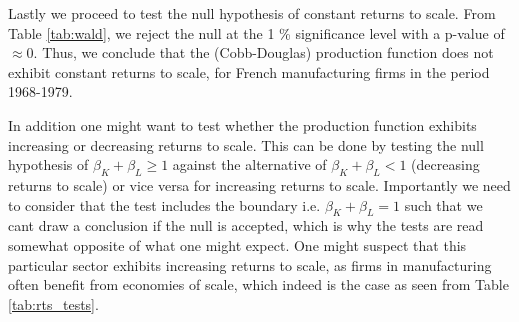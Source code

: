Lastly we proceed to test the null hypothesis of constant returns to scale. From Table \ref{tab:wald}, we reject the null at the 1 \% significance level with a p-value of $\approx 0$. Thus, we conclude that the (Cobb-Douglas) production function does not exhibit constant returns to scale, for French manufacturing firms in the period 1968-1979. 



In addition one might want to test whether the production function exhibits increasing or decreasing returns to scale. This can be done by testing the null hypothesis of $\beta_K + \beta_L \geq 1$ against the alternative of $\beta_K + \beta_L < 1$ (decreasing returns to scale) or vice versa for increasing returns to scale. Importantly we need to consider that the test includes the boundary i.e. $\beta_K + \beta_L = 1$ such that we cant draw a conclusion if the null is accepted, which is why the tests are read somewhat opposite of what one might expect. One might suspect that this particular sector exhibits increasing returns to scale, as firms in manufacturing often benefit from economies of scale, which indeed is the case as seen from Table \ref{tab:rts_tests}.


